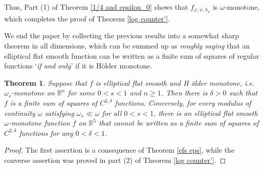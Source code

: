 \documentclass{amsart}
\newtheorem{theorem}{Theorem}[section]
\theoremstyle{plain}
\numberwithin{equation}{section}
\begin{document}
Thus, Part (1) of Theorem \ref{1/4 and epsilon_0} shows that $f_{\varphi
,\psi,h_{\rho }}$ is $\omega $-monotone, which completes the proof of
Theorem \ref{log counter'}.

We end the paper by collecting the previous results into a somewhat sharp
theorem in all dimensions, which can be summed up as \emph{roughly saying}
that an elliptical flat smooth function can be written as a finite sum of
squares of regular functions `\emph{if and only}' if it is H\"{o}lder
monotone.

\begin{theorem}
\label{power weakly mon SOS}Suppose that $f$ is elliptical flat smooth and H%
\"{o}lder monotone, i.e. $\omega _{s}$-monotone on $\mathbb{R}^{n}$ for some 
$0<s<1$ and $n\geq 1$. Then there is $\delta >0$ such that $f$ is a finite
sum of squares of $C^{2,\delta }$ functions. Conversely, for every modulus
of continuity $\omega $ satisfying $\omega _{s}\ll \omega $ for all $0<s<1$,
there is an elliptical flat smooth $\omega $-monotone function $f$ on $%
\mathbb{R}^{5}$ that \emph{cannot} be written as a finite sum of squares of $%
C^{2,\delta }$ functions for any $0<\delta <1$.
\end{theorem}

\begin{proof}
The first assertion is a consequence of Theorem \ref{efs eps}, while the
converse assertion was proved in part (2) of Theorem \ref{log counter'}.
\end{proof}
\end{document}
